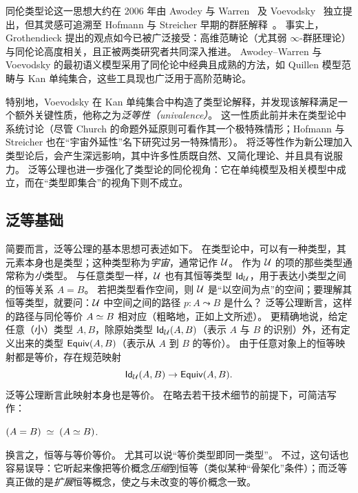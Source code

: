 同伦类型论这一思想大约在 2006 年由 Awodey 与 Warren~\cite{AW} 及 Voevodsky~\cite{VV} 独立提出，但其灵感可追溯至 Hofmann 与 Streicher 早期的群胚解释~\cite{hs:gpd-typethy}。
事实上，Grothendieck 提出的观点如今已被广泛接受：高维范畴论（尤其弱 $\infty$-群胚理论）与同伦论高度相关，且正被两类研究者共同深入推进。
Awodey--Warren 与 Voevodsky 的最初语义模型采用了同伦论中经典且成熟的方法，如 Quillen 模型范畴与 Kan 单纯集合，这些工具现也广泛用于高阶范畴论。
%
%

特别地，Voevodsky 在 Kan 单纯集合中构造了类型论解释，并发现该解释满足一个额外关键性质，他称之为\emph{泛等性（univalence）}。
这一性质此前并未在类型论中系统讨论（尽管 Church 的命题外延原则可看作其一个极特殊情形；Hofmann 与 Streicher 也在“宇宙外延性”名下研究过另一特殊情形）。
将泛等性作为新公理加入类型论后，会产生深远影响，其中许多性质既自然、又简化理论、并且具有说服力。
泛等公理也进一步强化了类型论的同伦视角：它在单纯模型及相关模型中成立，而在“类型即集合”的视角下则不成立。

\subsection*{泛等基础}

简要而言，泛等公理的基本思想可表述如下。
在类型论中，可以有一种类型，其元素本身也是类型；这种类型称为\emph{宇宙}，通常记作 $\UU$。
作为 $\UU$ 的项的那些类型通常称为\emph{小}类型。
%
%
与任意类型一样，$\UU$ 也有其恒等类型 $\idtypevar{\UU}$，用于表达小类型之间的恒等关系 $A = B$。
若把类型看作空间，则 $\UU$ 是“以空间为点”的空间；要理解其恒等类型，就要问：$\UU$ 中空间之间的路径 $p : A \leadsto B$ 是什么？
泛等公理断言，这样的路径与同伦等价 $\eqv A B$ 相对应（粗略地，正如上文所述）。
更精确地说，给定任意（小）类型 $A,B$，除原始类型 $\idtype[\UU]AB$（表示 $A$ 与 $B$ 的识别）外，还有定义出来的类型 $\texteqv AB$（表示从 $A$ 到 $B$ 的等价）。
由于任意对象上的恒等映射都是等价，存在规范映射
\[\idtype[\UU]AB\to\texteqv AB.\]
泛等公理断言此映射本身也是等价。
在略去若干技术细节的前提下，可简洁写作：

\begin{description}%
\item[泛等公理:]  $\eqvspaced{(A = B)}{(\eqv A B)}$.
\end{description}
%
换言之，恒等与等价等价。%
尤其可以说“等价类型即同一类型”。
不过，这句话也容易误导：它听起来像把等价概念\emph{压缩}到恒等（类似某种“骨架化”条件）；而泛等真正做的是\emph{扩展}恒等概念，使之与未改变的等价概念一致。

